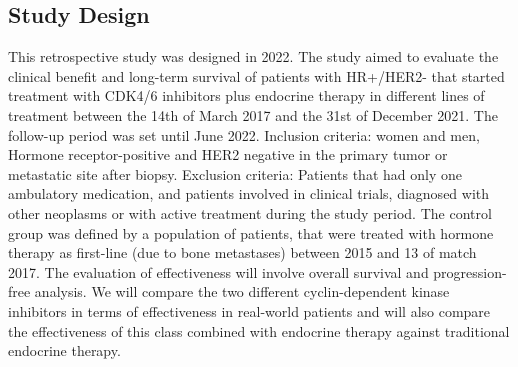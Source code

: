 

\subsection{Study Design}


This retrospective study was designed in 2022. The study aimed to evaluate the clinical benefit and long-term survival of patients with HR+/HER2- that started treatment with CDK4/6 inhibitors plus endocrine therapy in different lines of treatment between the 14th of March 2017 and the 31st of December 2021. The follow-up period was set until June 2022. Inclusion criteria: women and men, Hormone receptor-positive and HER2 negative in the primary tumor or metastatic site after biopsy. Exclusion criteria: Patients that had only one ambulatory medication, and patients involved in clinical trials, diagnosed with other neoplasms or with active treatment during the study period. The control group was defined by a population of patients, that were treated with hormone therapy as first-line (due to bone metastases) between 2015 and 13 of match 2017.
The evaluation of effectiveness will involve overall survival and progression-free analysis. We will compare the two different cyclin-dependent kinase inhibitors in terms of effectiveness in real-world patients and will also compare the effectiveness of this class combined with endocrine therapy against traditional endocrine therapy.




